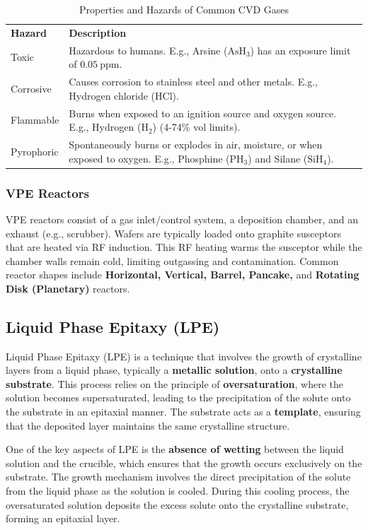 \documentclass{report}
\begin{document}
\begin{table}[h]
\centering
\caption{Properties and Hazards of Common CVD Gases}
\begin{tabular}{p{2cm}p{6cm}}\\
\textbf{Hazard} & \textbf{Description} \\
Toxic & Hazardous to humans. E.g., Arsine ($\text{AsH}_3$) has an exposure limit of $0.05~\text{ppm}$. \\
Corrosive & Causes corrosion to stainless steel and other metals. E.g., Hydrogen chloride ($\text{HCl}$). \\
Flammable & Burns when exposed to an ignition source and oxygen source. E.g., Hydrogen ($\text{H}_2$) (4-74\% vol limits). \\
Pyrophoric & Spontaneously burns or explodes in air, moisture, or when exposed to oxygen. E.g., Phosphine ($\text{PH}_3$) and Silane ($\text{SiH}_4$). \\
\end{tabular}
\end{table}

\subsubsection{VPE Reactors}
VPE reactors consist of a gas inlet/control system, a deposition chamber, and an exhaust (e.g., scrubber). Wafers are typically loaded onto graphite susceptors that are heated via RF induction. This RF heating warms the susceptor while the chamber walls remain cold, limiting outgassing and contamination. Common reactor shapes include \textbf{Horizontal, Vertical, Barrel, Pancake,} and \textbf{Rotating Disk (Planetary)} reactors.
\subsection{Liquid Phase Epitaxy (LPE)}
Liquid Phase Epitaxy (LPE) is a technique that involves the growth of crystalline layers from a liquid phase, typically a \textbf{metallic solution}, onto a \textbf{crystalline substrate}. This process relies on the principle of \textbf{oversaturation}, where the solution becomes supersaturated, leading to the precipitation of the solute onto the substrate in an epitaxial manner. The substrate acts as a \textbf{template}, ensuring that the deposited layer maintains the same crystalline structure.

One of the key aspects of LPE is the \textbf{absence of wetting} between the liquid solution and the crucible, which ensures that the growth occurs exclusively on the substrate. The growth mechanism involves the direct precipitation of the solute from the liquid phase as the solution is cooled. During this cooling process, the oversaturated solution deposits the excess solute onto the crystalline substrate, forming an epitaxial layer.
\end{document}
